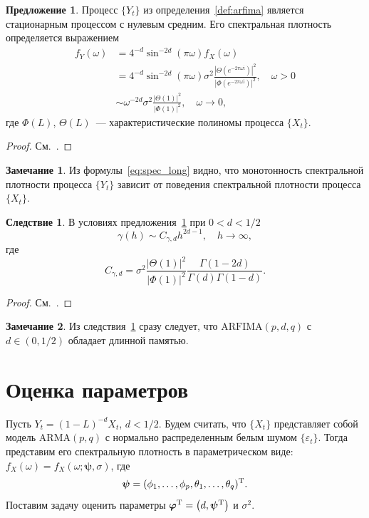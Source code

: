 \documentclass[specialist,
substylefile = spbu_report.rtx,
subf,href,colorlinks=true, 12pt]{disser}
\theoremstyle{definition}
\newtheorem{remark}{Замечание}[chapter]
\newtheorem{proposition}{Предложение}[chapter]
\newtheorem{corollary}{Следствие}[chapter]
\newcommand{\im}{\mathrm{i}}
\begin{document}
\begin{proposition}\label{prop1}
	Процесс $\{Y_t\}$ из определения~\ref{def:arfima} является стационарным процессом с нулевым средним. Его спектральная плотность определяется выражением
	\begin{equation}\label{eq:spec_long}
		\begin{aligned}
			f_Y(\omega) & =4^{-d}\sin^{-2d}\left(\pi\omega\right)f_X(\omega)                                                                                                      \\
			            & =4^{-d}\sin^{-2d}\left(\pi\omega\right)\sigma^2\frac{\left|\Theta(e^{-2\pi \omega\im})\right|^2}{\left|\Phi(e^{-2\pi\omega\im})\right|^2},\quad\omega>0 \\
			            & \sim\omega^{-2d}\sigma^2\frac{|\Theta(1)|^2}{|\Phi(1)|^2},\quad \omega\to0,
		\end{aligned}
	\end{equation}
	где $\Phi(L)$, $\Theta(L)$~--- характеристические полиномы процесса $\{X_t\}$.
\end{proposition}
\begin{proof}
	См.~\cite[Proposition 6.1]{Hassler2018}.
\end{proof}
\begin{remark}
	Из формулы~\eqref{eq:spec_long} видно, что монотонность спектральной плотности процесса $\{Y_t\}$ зависит от поведения спектральной плотности процесса $\{X_t\}$.
\end{remark}
\begin{corollary}\label{corollary1}
	В условиях предложения~\ref{prop1} при $0<d<1/2$
	\[
		\gamma(h)\sim C_{\gamma,d}h^{2d-1},\quad h\to\infty,
	\]
	где
	\[
		C_{\gamma,d}=\sigma^2 \frac{|\Theta(1)|^2}{|\Phi(1)|^2} \frac{\Gamma(1-2d)}{\Gamma(d)\Gamma(1-d)}.
	\]
\end{corollary}
\begin{proof}
	См.~\cite[Corollary 6.1]{Hassler2018}.
\end{proof}
\begin{remark}
	Из следствия~\ref{corollary1} сразу следует, что $\mathrm{ARFIMA}(p, d, q)$ с $d\in(0, 1/2)$ обладает длинной памятью.
\end{remark}

\section{Оценка параметров}
Пусть $Y_t=(1-L)^{-d}X_t$, $d<1/2$. Будем считать, что $\{X_t\}$ представляет собой модель $\mathrm{ARMA}(p, q)$ с нормально распределенным белым шумом $\{\varepsilon_t\}$. Тогда представим его спектральную плотность в параметрическом виде: $f_X(\omega)=f_X(\omega; \bm\psi, \sigma)$, где
\[
	\bm\psi=(\phi_1,\ldots,\phi_p,\theta_1,\ldots,\theta_q)^{\mathrm{T}}.
\]
Поставим задачу оценить параметры $\bm\varphi^{\mathrm{T}}=\left(d, \bm\psi^{\mathrm{T}}\right)$ и $\sigma^2$.
\end{document}
